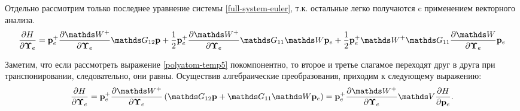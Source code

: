 Отдельно рассмотрим только последнее уравнение системы \eqref{full-system-euler}, т.к. остальные легко получаются c применением векторного анализа. 
\begin{gather}
    \frac{\partial H}{\partial \bUpsilon} = \mf{p}_e^+ \frac{\partial \bbW^+}{\partial \bUpsilon} \bbG_{12} \mf{p} + \frac{1}{2} \mf{p}_e^+ \frac{\partial \bbW^+}{\partial \bUpsilon} \bbG_{11} \bbW \pe + \frac{1}{2} \mf{p}_e^+ \bbW^+ \bbG_{11} \frac{\partial \bbW}{\partial \bUpsilon} \pe \label{polyatom-temp5} 
\end{gather}

Заметим, что если рассмотреть выражение \eqref{polyatom-temp5} покомпонентно, то второе и третье слагамое переходят друг в друга при транспонировании, следовательно, они равны. Осуществив алгебраические преобразования, приходим к следующему выражению: 
\begin{gather}
    \frac{\partial H}{\partial \bUpsilon} = \mf{p}_e^+ \frac{\partial \bbW^+}{\partial \bUpsilon} \lb \bbG_{12} \mf{p} + \bbG_{11} \bbW \pe \rb = \mf{p}_e^+ \frac{\partial \bbW^+}{\partial \bUpsilon} \bbV \frac{\partial H}{\partial \pe}.
\end{gather}

